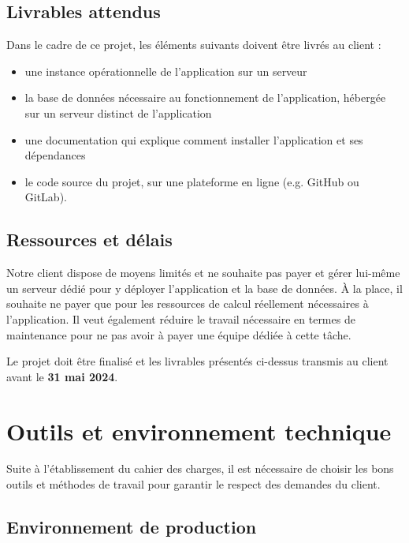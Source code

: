 \documentclass[french]{article}
\begin{document}
    \subsection{Livrables attendus}
    Dans le cadre de ce projet, les éléments suivants doivent être livrés au client :
    \begin{itemize}
        \item une instance opérationnelle de l'application sur un serveur 
        \item la base de données nécessaire au fonctionnement de l'application, hébergée sur un serveur distinct de l'application
        \item une documentation qui explique comment installer l'application et ses dépendances
        \item le code source du projet, sur une plateforme en ligne (e.g. GitHub ou GitLab).
    \end{itemize}
    \subsection{Ressources et délais}

    Notre client dispose de moyens limités et ne souhaite pas payer et gérer lui-même un serveur dédié pour y déployer l'application et la base de données. À la place, il souhaite ne payer que pour les ressources de calcul réellement nécessaires à l'application. Il veut également réduire le travail nécessaire en termes de maintenance pour ne pas avoir à payer une équipe dédiée à cette tâche.
    
    Le projet doit être finalisé et les livrables présentés ci-dessus transmis au client avant le \textbf{31 mai 2024}.
    \section{Outils et environnement technique}

    Suite à l'établissement du cahier des charges, il est nécessaire de choisir les bons outils et méthodes de travail pour garantir le respect des demandes du client.
    \subsection{Environnement de production}
\end{document}

